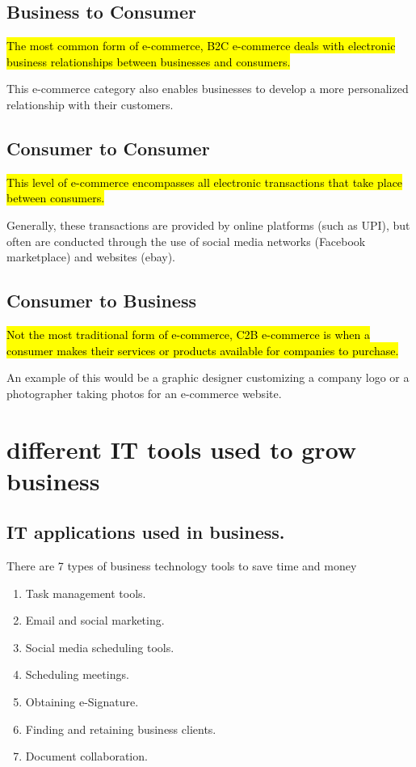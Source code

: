 \documentclass[12pt, a4paper]{article}
\begin{document}
\subsection{Business to Consumer}
\hl{The most common form of e-commerce, B2C e-commerce deals with
electronic business relationships between businesses and consumers.}

This e-commerce category also enables businesses to develop a more
personalized relationship with their customers.

\subsection{Consumer to Consumer}
\hl{This level of e-commerce encompasses all electronic transactions that take
place between consumers.}

Generally, these transactions are provided by online platforms (such as UPI),
but often are conducted through the use of social media networks (Facebook
marketplace) and websites (ebay).

\subsection{Consumer to Business}
\hl{Not the most traditional form of e-commerce, C2B e-commerce is when a
consumer makes their services or products available for companies to purchase.}

An example of this would be a graphic designer customizing a company logo or a
photographer taking photos for an e-commerce website. %

\section{different IT tools used to grow business}
\subsection{IT applications used in business.}%
There are 7 types of business technology tools to save time and money
\begin{enumerate}
  \item Task management tools.
  \item Email and social marketing.
  \item Social media scheduling tools.
  \item Scheduling meetings.
  \item Obtaining e-Signature.
  \item Finding and retaining business clients.
  \item Document collaboration.
\end{enumerate}%
\end{document}
